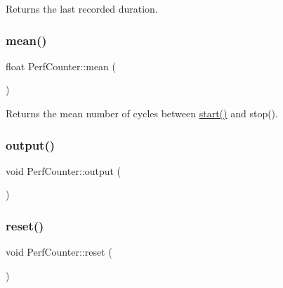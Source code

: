 Returns the last recorded duration. 

\mbox{\label{classPerfCounter_a5992367178f424e486a7709659e276a6}} 
\subsubsection{\texorpdfstring{mean()}{mean()}}
{\footnotesize\ttfamily float Perf\+Counter\+::mean (\begin{DoxyParamCaption}{ }\end{DoxyParamCaption})\hspace{0.3cm}{\ttfamily [inline]}}



Returns the mean number of cycles between {\ttfamily \hyperlink{classPerfCounter_a5fdd73c1d604decd6dc745aada8092d1}{start()}} and {\ttfamily stop()}. 

\mbox{\label{classPerfCounter_a291ce8187d35e1f97a68339fe51931a4}} 
\subsubsection{\texorpdfstring{output()}{output()}}
{\footnotesize\ttfamily void Perf\+Counter\+::output (\begin{DoxyParamCaption}{ }\end{DoxyParamCaption})\hspace{0.3cm}{\ttfamily [inline]}}

\mbox{\label{classPerfCounter_a60f7428eabd82437280b662d6829e184}} 
\subsubsection{\texorpdfstring{reset()}{reset()}}
{\footnotesize\ttfamily void Perf\+Counter\+::reset (\begin{DoxyParamCaption}{ }\end{DoxyParamCaption})\hspace{0.3cm}{\ttfamily [inline]}}

\mbox{\label{classPerfCounter_a5fdd73c1d604decd6dc745aada8092d1}} 
